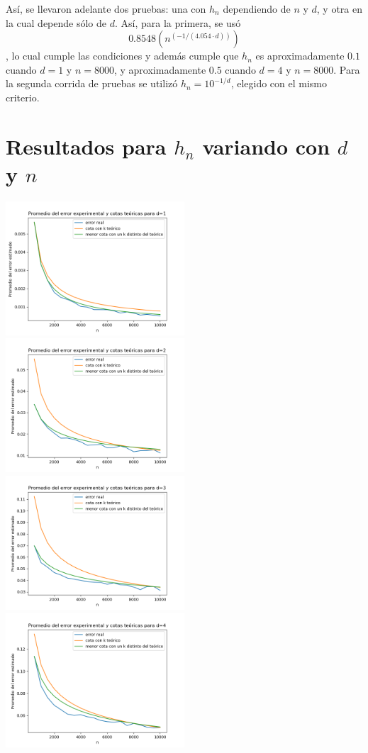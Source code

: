 \documentclass[12pt, a4paper]{article}
\begin{document}
Así, se llevaron adelante dos pruebas: una con $h_n$ dependiendo de $n$ y $d$, y otra en la cual depende sólo de $d$. Así, para la primera, se usó $$ 0.8548 (n^{(-1/(4.054 \cdot d))}) $$, lo cual cumple las condiciones y además cumple que $h_n$ es aproximadamente $0.1$ cuando $d=1$ y $n=8000$, y aproximadamente $0.5$ cuando $d=4$ y $n=8000$. Para la segunda corrida de pruebas se utilizó $h_n=10^{-1/d}$, elegido con el mismo criterio.

\section{Resultados para $h_n$ variando con $d$ y $n$}

\includegraphics[width=0.5\textwidth]{figuras_h_dinamico/cotas-error-d=1}
\includegraphics[width=0.5\textwidth]{figuras_h_dinamico/cotas-error-d=2}
\includegraphics[width=0.5\textwidth]{figuras_h_dinamico/cotas-error-d=3}
\includegraphics[width=0.5\textwidth]{figuras_h_dinamico/cotas-error-d=4}
\end{document}
